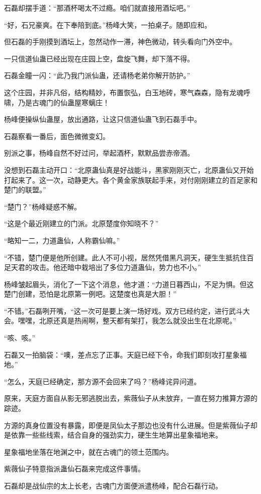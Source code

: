 \begin{this_body}
石磊却摆手道：“那酒杯喝太不过瘾。咱们就直接用酒坛吧。”

“好，石兄豪爽。在下奉陪到底。”杨峰大笑，一拍桌子。随即应和。

但石磊的手刚摸到酒坛上，忽然动作一滞，神色微动，转头看向门外空中。

一只信道仙蛊已经出现在庄园上空，盘旋飞舞，却下落不得。

石磊金瞳一闪：“此乃我门派仙蛊，还请杨老弟你解开防护。”

这个庄园，并非凡俗，结构精妙，布置恢弘，白玉地砖，寒气森森，隐有龙魂呼啸，乃是古魂门的仙蛊屋寒螭庄！

杨峰便操纵仙蛊屋，放出通路，让这只信道仙蛊飞到石磊手中。

石磊察看一番后，面色微微变幻。

别派之事，杨峰自然不好过问，举起酒杯，默默品尝赤帝酒。

没想到石磊主动开口：“北原蛊仙真是好战能斗，黑家刚刚灭亡，北原蛊仙又开始打起来了。这一次，动静更大。各个黄金家族联起手来，对付刚刚建立的百足家和楚门的联盟。”

“楚门？”杨峰疑惑不解。

“这是个最近刚建立的门派。北原楚度你知晓不？”

“略知一二，力道蛊仙，人称霸仙嘛。”

“不错，楚门便是他所创建。此人不可小视，居然凭借黑凡洞天，硬生生抵抗住百足天君的攻击。他还暗中栽培出了多位力道蛊仙，势力也不小。”

杨峰皱起眉头，消化了一下这个消息，他才道：“力道日暮西山，不足为惧。但这楚门创建，恐怕是北原第一例吧。这楚度也真是大胆！”

“不错。”石磊咧开嘴，“这一次可是要上演一场好戏。双方已经约定，进行武斗大会。嘿嘿，北原还真是热闹啊，整天都有架打，我怎么就没出生在北原呢。”

“咳、咳。”

石磊又一拍脑袋：“噢，差点忘了正事。天庭已经下令，命我们即刻攻打星象福地。”

“怎么，天庭已经确定，那方源不会回来了吗？”杨峰诧异问道。

原来，天庭方面自从影无邪逃脱出去，紫薇仙子从未放弃，一直在努力推算方源的踪迹。

方源的真身位置没有暴露，即便是凤仙太子那边也没有什么进展。但是紫薇仙子却是依靠一些些线索，结合自身的强劲实力，硬生生地算出星象福地来。

星象福地坐落在地渊之中，就在古魂门的领土范围内。

紫薇仙子特意指派蛊仙石磊来完成这件事情。

石磊却是战仙宗的太上长老，古魂门方面便派遣杨峰，配合石磊行动。


\end{this_body}
